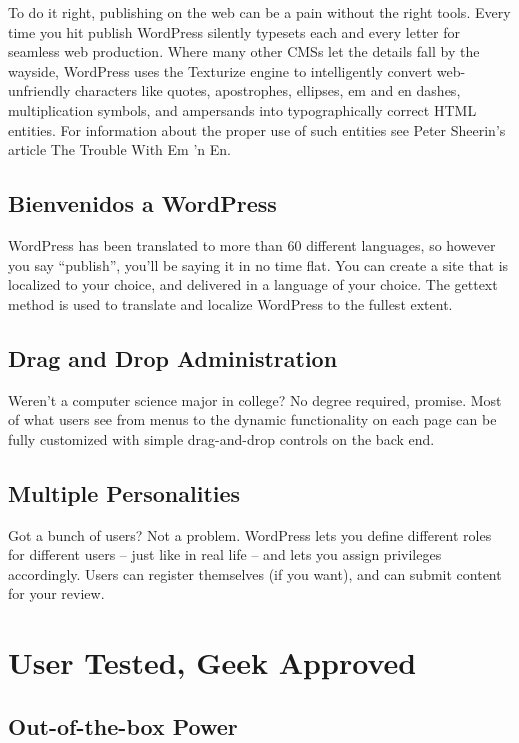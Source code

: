 To do it right, publishing on the web can be a pain without the right tools. Every time you hit publish WordPress silently typesets each and every letter for seamless web production. Where many other CMSs let the details fall by the wayside, WordPress uses the Texturize engine to intelligently convert web-unfriendly characters like quotes, apostrophes, ellipses, em and en dashes, multiplication symbols, and ampersands into typographically correct HTML entities. For information about the proper use of such entities see Peter Sheerin's article The Trouble With Em ’n En.

\subsection{Bienvenidos a WordPress}

WordPress has been translated to more than 60 different languages, so however you say “publish”, you’ll be saying it in no time flat. You can create a site that is localized to your choice, and delivered in a language of your choice. The gettext method is used to translate and localize WordPress to the fullest extent.

\subsection{Drag and Drop Administration}

Weren’t a computer science major in college? No degree required, promise. Most of what users see from menus to the dynamic functionality on each page can be fully customized with simple drag-and-drop controls on the back end.

\subsection{Multiple Personalities}

Got a bunch of users? Not a problem. WordPress lets you define different roles for different users – just like in real life – and lets you assign privileges accordingly. Users can register themselves (if you want), and can submit content for your review.

\section{User Tested, Geek Approved}

\subsection{Out-of-the-box Power}

